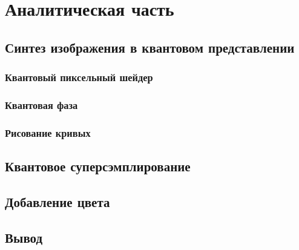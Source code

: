 \chapter{Аналитическая часть}

\section{Синтез изображения в квантовом представлении}
\subsection{Квантовый пиксельный шейдер}
\subsection{Квантовая фаза}
\subsection{Рисование кривых}

\section{Квантовое суперсэмплирование}
\section{Добавление цвета}


\section*{Вывод}

